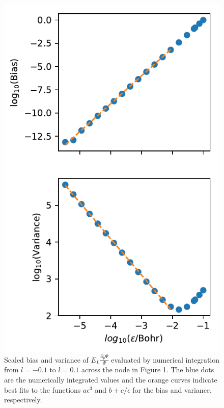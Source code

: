 \documentclass[twocolumn]{revtex4-1}
\begin{document}
\begin{figure}
\includegraphics{../2_plots/integratenode.pdf}
\caption{Scaled bias and variance of $E_L\frac{\partial_p \Psi}{\Psi}$ evaluated by numerical integration from $l = -0.1$ to $l = 0.1$ across the node in Figure 1. The blue dots are the numerically integrated values and the orange curves indicate best fits to the functions $a\epsilon^3$ and $b + c/\epsilon$ for the bias and variance, respectively.}
\end{figure}
\end{document}
